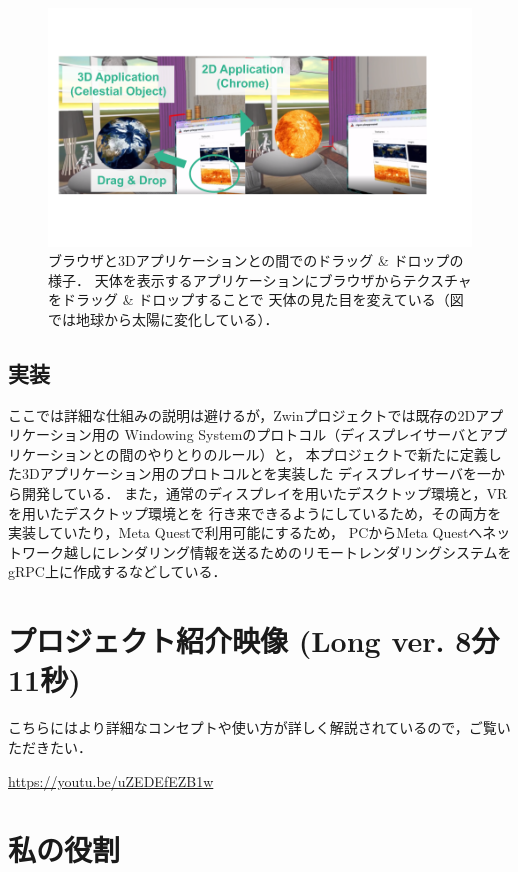 \documentclass[a4paper]{jsarticle}
\begin{document}
\begin{figure}[htbp]
  \centering
  \includegraphics[width=\linewidth]{figure/zwin2.png}
  \caption{
    ブラウザと3Dアプリケーションとの間でのドラッグ \& ドロップの様子．
    天体を表示するアプリケーションにブラウザからテクスチャをドラッグ \& ドロップすることで
    天体の見た目を変えている（図では地球から太陽に変化している）．
  }
  \label{fig:zwin2}
\end{figure}

\subsection{実装}

ここでは詳細な仕組みの説明は避けるが，Zwinプロジェクトでは既存の2Dアプリケーション用の
Windowing Systemのプロトコル（ディスプレイサーバとアプリケーションとの間のやりとりのルール）と，
本プロジェクトで新たに定義した3Dアプリケーション用のプロトコルとを実装した
ディスプレイサーバを一から開発している．
また，通常のディスプレイを用いたデスクトップ環境と，VRを用いたデスクトップ環境とを
行き来できるようにしているため，その両方を実装していたり，Meta Questで利用可能にするため，
PCからMeta Questへネットワーク越しにレンダリング情報を送るためのリモートレンダリングシステムを
gRPC上に作成するなどしている．

\section{プロジェクト紹介映像 (Long ver. 8分11秒)}
こちらにはより詳細なコンセプトや使い方が詳しく解説されているので，ご覧いただきたい．

\url{https://youtu.be/uZEDEfEZB1w}

\section{私の役割}
\end{document}
